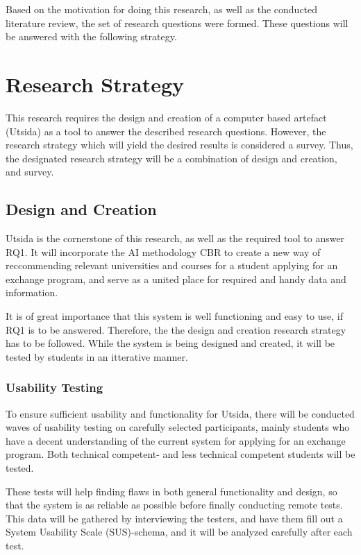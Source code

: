 Based on the motivation for doing this research, as well as the conducted literature review, the set of research questions were formed. These questions will be answered with the following strategy.

\section{Research Strategy}

This research requires the design and creation of a computer based artefact (Utsida) as a tool to answer the described research questions. However, the research strategy which will yield the desired results is considered a survey. Thus, the designated research strategy will be a combination of design and creation, and survey. 

\subsection{Design and Creation}

Utsida is the cornerstone of this research, as well as the required tool to answer RQ1. It will incorporate the AI methodology CBR to create a new way of reccommending relevant universities and courses for a student applying for an exchange program, and serve as a united place for required and handy data and information. 

It is of great importance that this system is well functioning and easy to use, if RQ1 is to be answered. Therefore, the the design and creation research strategy has to be followed. While the system is being designed and created, it will be tested by students in an itterative manner.

\subsubsection{Usability Testing}

To ensure sufficient usability and functionality for Utsida, there will be conducted waves of usability testing on carefully selected participants, mainly students who have a decent understanding of the current system for applying for an exchange program. Both technical competent- and less technical competent students will be tested.

These tests will help finding flaws in both general functionality and design, so that the system is as reliable as possible before finally conducting remote tests. This data will be gathered by interviewing the testers, and have them fill out a System Usability Scale (SUS)-schema\cite{brooke1996sus}, and it will be analyzed carefully after each test.



